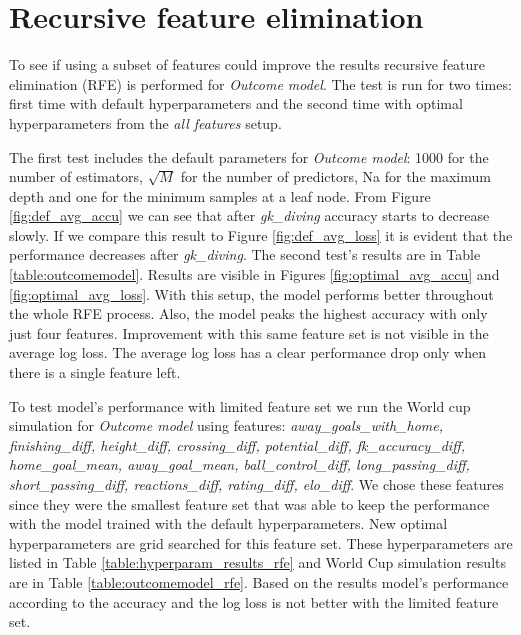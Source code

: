 \section{Recursive feature elimination}
To see if using a subset of features could improve the results recursive feature elimination (RFE) is performed for \textit{Outcome model}. The test is run for two times: first time with default hyperparameters and the second time with optimal hyperparameters from the \textit{all features} setup.

The first test includes the default parameters for \textit{Outcome model}: 1000 for the number of estimators, $\sqrt{M}$ for the number of predictors, Na for the maximum depth and one for the minimum samples at a leaf node. From Figure \ref{fig:def_avg_accu} we can see that after \textit{gk\_diving} accuracy starts to decrease slowly. If we compare this result to Figure \ref{fig:def_avg_loss} it is evident that the performance decreases after \textit{gk\_diving}. The second test's results are in Table \ref{table:outcomemodel}. Results are visible in Figures \ref{fig:optimal_avg_accu} and \ref{fig:optimal_avg_loss}. With this setup, the model performs better throughout the whole RFE process. Also, the model peaks the highest accuracy with only just four features. Improvement with this same feature set is not visible in the average log loss. The average log loss has a clear performance drop only when there is a single feature left.

To test model's performance with limited feature set we run the World cup simulation for \textit{Outcome model} using features: \textit{away\_goals\_with\_home, finishing\_diff, height\_diff, crossing\_diff, potential\_diff, fk\_accuracy\_diff, home\_goal\_mean, away\_goal\_mean, ball\_control\_diff, long\_passing\_diff,  short\_passing\_diff, reactions\_diff, rating\_diff, elo\_diff}. We chose these features since they were the smallest feature set that was able to keep the performance with the model trained with the default hyperparameters. New optimal hyperparameters are grid searched for this feature set. These hyperparameters are listed in Table \ref{table:hyperparam_results_rfe} and World Cup simulation results are in Table \ref{table:outcomemodel_rfe}. Based on the results model's performance according to the accuracy and the log loss is not better with the limited feature set.

